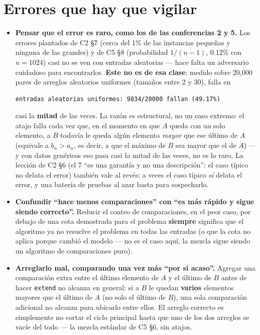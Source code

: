 \documentclass[11pt]{article}
\begin{document}
\section*{Errores que hay que vigilar}

\begin{alerta}{}
\begin{itemize}[leftmargin=14pt]
\item \textbf{Pensar que el error es raro, como los de las conferencias 2 y 5.} Los errores plantados de
C2 §7 (cerca del 1\% de las instancias pequeñas y ninguna de las grandes) y de C5 §8 (probabilidad $1/(n-1)$,
0.12\% con $n=1024$) casi no se ven con entradas aleatorias --- hace falta un adversario cuidadoso para
encontrarlos. \textbf{Este no es de esa clase}: medido sobre 20{,}000 pares de arreglos aleatorios
uniformes (tamaños entre 2 y 30), falla en
\begin{lstlisting}[style=salida]
entradas aleatorias uniformes: 9834/20000 fallan (49.17%)
\end{lstlisting}
casi la \textbf{mitad} de las veces. La razón es estructural, no un caso extremo: el atajo falla cada vez
que, en el momento en que $A$ queda con un solo elemento, a $B$ todavía le queda algún elemento \emph{mayor}
que ese último de $A$ (equivale a $b_n>a_n$, es decir, a que el máximo de $B$ sea mayor que el de $A$) --- y con datos
genéricos eso pasa casi la mitad de las veces, no es lo raro. La lección de C2 §6 (el 7 ``es una garantía y
no una descripción'': el caso típico no delata el error) también vale al revés: a veces el caso típico
\emph{sí} delata el error, y una batería de pruebas al azar basta para sospecharlo.
\item \textbf{Confundir ``hace menos comparaciones'' con ``es más rápido y sigue siendo correcto''.}
Reducir el conteo de comparaciones, en el peor caso, por debajo de una cota demostrada para el problema
\textbf{siempre} significa que el algoritmo ya no resuelve el problema en todas las entradas (o que la cota no aplica
porque cambió el modelo --- no es el caso aquí, la mezcla sigue siendo un algoritmo de comparaciones puro).
\item \textbf{Arreglarlo mal, comparando una vez más ``por si acaso''.} Agregar una comparación extra entre
el último elemento de $A$ y el último de $B$ antes de hacer \texttt{extend} no alcanza en general: si a $B$
le quedan \textbf{varios} elementos mayores que el último de $A$ (no solo el último de $B$), una sola
comparación adicional no alcanza para ubicarlo entre ellos. El arreglo correcto es simplemente no cortar el ciclo principal hasta que uno de
los dos arreglos se vacíe del todo --- la mezcla estándar de C5 §6, sin atajos.
\end{itemize}
\end{alerta}
\end{document}
